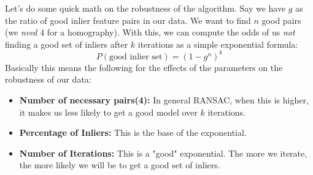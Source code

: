 \documentclass{article}
\begin{document}
Let's do some quick math on the robustness of the algorithm. Say we have $g$ as the ratio of good inlier feature pairs in our data. We want to find $n$ good pairs (we \textit{need} 4 for a homography). With this, we can compute the odds of us \textit{not} finding a good set of inliers after $k$ iterations as a simple exponential formula:
$$P(\text{good inlier set}) = (1 - g^n)^k$$
Basically this means the following for the effects of the parameters on the robustness of our data:
\begin{itemize}
    \item \textbf{Number of necessary pairs(4):} In general RANSAC, when this is higher, it makes us less likely to get a good model over $k$ iterations. 
    \item \textbf{Percentage of Inliers:} This is the base of the exponential.
    \item \textbf{Number of Iterations:} This is a "good" exponential. The more we iterate, the more likely we will be to get a good set of inliers. 
\end{itemize}
\end{document}
